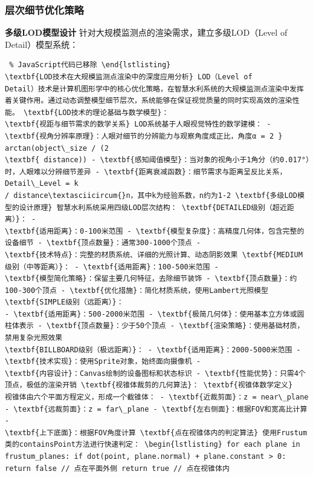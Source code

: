 {{{{\subsubsection{层次细节优化策略}\label{ux5c42ux6b21ux7ec6ux8282ux4f18ux5316ux7b56ux7565} \textbf{多级LOD模型设计}
针对大规模监测点的渲染需求，建立多级LOD（Level of Detail）模型系统： \begin{lstlisting} % JavaScript代码已移除 \end{lstlisting}
\textbf{LOD技术在大规模监测点渲染中的深度应用分析} LOD（Level of
Detail）技术是计算机图形学中的核心优化策略，在智慧水利系统的大规模监测点渲染中发挥着关键作用。通过动态调整模型细节层次，系统能够在保证视觉质量的同时实现高效的渲染性能。 \textbf{LOD技术的理论基础与数学模型}：
\textbf{视距与细节需求的数学关系} LOD系统基于人眼视觉特性的数学建模： - \textbf{视角分辨率原理}：人眼对细节的分辨能力与观察角度成正比，角度α = 2 } arctan(object\_size / (2
\textbf{ distance)) - \textbf{感知阈值模型}：当对象的视角小于1角分（约0.017°）时，人眼难以分辨细节差异 - \textbf{距离衰减函数}：细节需求与距离呈反比关系，Detail\_Level = k
/ distance\textasciicircum{}n，其中k为经验系数，n约为1-2 \textbf{多级LOD模型的设计原理} 智慧水利系统采用四级LOD层次结构： \textbf{DETAILED级别（超近距离）}： -
\textbf{适用距离}：0-100米范围 - \textbf{模型复杂度}：高精度几何体，包含完整的设备细节 - \textbf{顶点数量}：通常300-1000个顶点 -
\textbf{技术特点}：完整的材质系统、详细的光照计算、动态阴影效果 \textbf{MEDIUM级别（中等距离）}： - \textbf{适用距离}：100-500米范围 -
\textbf{模型简化策略}：保留主要几何特征，去除细节装饰 - \textbf{顶点数量}：约100-300个顶点 - \textbf{优化措施}：简化材质系统，使用Lambert光照模型 \textbf{SIMPLE级别（远距离）}：
- \textbf{适用距离}：500-2000米范围 - \textbf{极简几何体}：使用基本立方体或圆柱体表示 - \textbf{顶点数量}：少于50个顶点 - \textbf{渲染策略}：使用基础材质，禁用复杂光照效果
\textbf{BILLBOARD级别（极远距离）}： - \textbf{适用距离}：2000-5000米范围 - \textbf{技术实现}：使用Sprite对象，始终面向摄像机 -
\textbf{内容设计}：Canvas绘制的设备图标和状态标识 - \textbf{性能优势}：只需4个顶点，极低的渲染开销 \textbf{视锥体裁剪的几何算法}： \textbf{视锥体数学定义}
视锥体由六个平面方程定义，形成一个截锥体： - \textbf{近裁剪面}：z = near\_plane - \textbf{远裁剪面}：z = far\_plane - \textbf{左右侧面}：根据FOV和宽高比计算 -
\textbf{上下底面}：根据FOV角度计算 \textbf{点在视锥体内的判定算法} 使用Frustum类的containsPoint方法进行快速判定： \begin{lstlisting} for each plane in
frustum_planes: if dot(point, plane.normal) + plane.constant > 0: return false // 点在平面外侧 return true // 点在视锥体内

\end{lstlisting}}}}}
